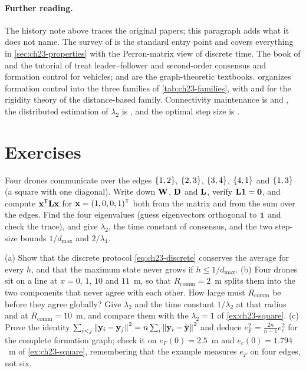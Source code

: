 \paragraph{Further reading.}
The history note above traces the original papers; this paragraph adds what it
does not name. The survey of \textcite{olfatisaber2007consensus} is the
standard entry point and covers everything in \cref{sec:ch23-properties} with
the Perron-matrix view of discrete time. The book of
\textcite{ren2008distributed} and the tutorial of \textcite{ren2007information}
treat leader--follower and second-order consensus and formation control for
vehicles; \textcite{mesbahi2010graph} and \textcite{bullo2009distributed} are
the graph-theoretic textbooks. \textcite{oh2015survey} organizes formation
control into the three families of \cref{tab:ch23-families}, with
\textcite{anderson2008rigid} and \textcite{krick2009stabilisation} for the
rigidity theory of the distance-based family. Connectivity maintenance is
\textcite{ji2007distributed} and \textcite{zavlanos2011graph}, the distributed
estimation of $\lambda_2$ is \textcite{yang2010decentralized}, and the optimal
step size is \textcite{xiao2004fast}.

\section{Exercises}
\label{sec:ch23-exercises}

\begin{exercise}[\difficulty{1}]
\label{exr:ch23-laplacian}
Four drones communicate over the edges $\left\{ 1,2 \right\}$, $\left\{ 2,3 \right\}$, $\left\{ 3,4 \right\}$,
$\left\{ 4,1 \right\}$ and $\left\{ 1,3 \right\}$ (a square with one diagonal). Write down
$\mathbf{W}$, $\mathbf{D}$ and $\mathbf{L}$, verify $\mathbf{L}\mathbf{1} = \mathbf{0}$, and
compute $\mathbf{x}^{\mathsf{T}}\mathbf{L}\mathbf{x}$ for $\mathbf{x} = (1, 0, 0, 1)^{\mathsf{T}}$ both from
the matrix and from the sum over the edges. Find the four eigenvalues (guess
eigenvectors orthogonal to $\mathbf{1}$ and check the trace), and give
$\lambda_2$, the time constant of consensus, and the two step-size bounds
$1/d_{\max}$ and $2/\lambda_4$.
\end{exercise}

\begin{exercise}[\difficulty{1}]
\label{exr:ch23-average}
(a) Show that the discrete protocol \cref{eq:ch23-discrete} conserves the
average for every $h$, and that the maximum state never grows if
$h \le 1/d_{\max}$. (b) Four drones sit on a line at $x = 0$, $1$, $10$
and $11$~m, so that $R_{\mathrm{comm}} = 2$~m splits them into the two
components that never agree with each other. How large must
$R_{\mathrm{comm}}$ be before they agree globally? Give $\lambda_2$ and the
time constant $1/\lambda_2$ at that radius and at $R_{\mathrm{comm}} = 10$~m,
and compare them with the $\lambda_2 = 1$ of \cref{ex:ch23-square}. (c) Prove the identity $\sum_{i<j}\left\lVert \mathbf{y}_i - \mathbf{y}_j \right\rVert^2 =
n\sum_i\left\lVert \mathbf{y}_i - \bar{\mathbf{y}} \right\rVert^2$ and deduce
$e_F^2 = \frac{2n}{n-1}e_c^2$ for the complete formation graph; check it on
$e_F(0) = 2.5$~m and $e_c(0) = 1.794$~m of \cref{ex:ch23-square}, remembering
that the example measures $e_F$ on four edges, not six.
\end{exercise}

